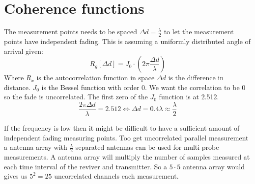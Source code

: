 

\section{Coherence functions}
The measurement points needs to be spaced $\Delta d = \frac{\lambda}{2}$ to let the measurement points have independent fading. This is assuming a uniformly distributed angle of arrival given:
\begin{equation}
R_g[\Delta d] = J_0\cdot(2\pi \frac{\Delta d}{\lambda})
\end{equation}
Where $R_x$ is the autocorrelation function in space $\Delta d$ is the difference in distance. $J_0$ is the Bessel function with order 0.
We want the correlation to be 0 so the fade is uncorrelated. The first zero of the $J_0$ function is at 2.512.
\begin{equation}
\frac{2\pi \Delta d}{\lambda} = 2.512 \Leftrightarrow \Delta d = 0.4 \lambda \approx \frac{\lambda}{2}
\end{equation}

If the frequency is low then it might be difficult to have a sufficient amount of independent fading measuring points. \citep[p.11]{UWMeasurement} Too get uncorrelated  parallel measurement a antenna array with $\frac{\lambda}{2}$ separated antennas can be used for multi probe measurements. A antenna array will multiply the number of samples measured at each time interval of the reviver and transmitter. So a $5\cdot 5$ antenna array would gives us $5^2 = 25$ uncorrelated channels each measurement.




